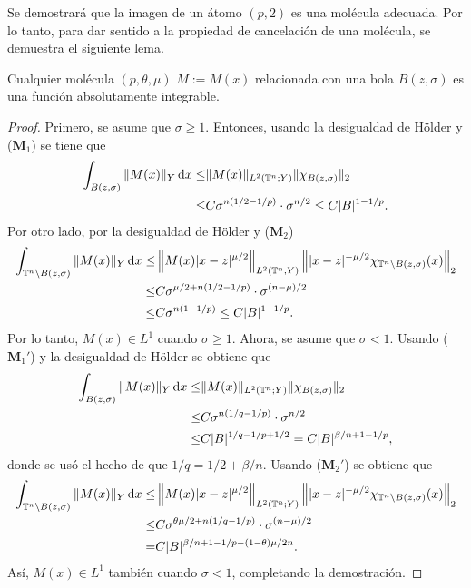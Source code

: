 Se demostrará que la imagen de un átomo $(p, 2)$ es una molécula adecuada. Por lo tanto, para dar sentido a la propiedad de cancelación de una molécula, se demuestra el siguiente lema.
\begin{lemma}
	Cualquier molécula $(p,\theta,\mu)$ $M:=M(x)$ relacionada con una bola $B(z, \sigma)$ es una función absolutamente integrable.
\end{lemma}
\begin{proof}
	Primero, se asume que $\sigma\geq1$. Entonces, usando la desigualdad de H\"older y ($\mathbf{M}_1$) se tiene que
	\begin{align*}
		\int_{B(z,\sigma)}\|M(x)\|_Y \mathop{}\!\mathrm{d} x \leq &  \|M(x)\|_{L^2(\mathbb{T}^n;Y)} \|\chi_{B(z,\sigma)}\|_2 \\
		\leq & C\sigma^{n(1/2-1/p)}\cdot \sigma^{n/2} \leq C|B|^{1-1/p}.
	\end{align*}
	Por otro lado, por la desigualdad de H\"older y ($\mathbf{M}_2$)
	\begin{align*}
		\int_{\mathbb{T}^n\setminus B(z,\sigma)}\|M(x)\|_Y\mathop{}\!\mathrm{d} x \leq &  \left\|M(x)|x-z|^{\mu/2} \right\|_{L^2(\mathbb{T}^n;Y)} \left\| |x-z|^{-\mu/2} \chi_{\mathbb{T}^n\setminus B(z,\sigma)}(x) \right\|_2 \\
		\leq & C \sigma^{\mu/2 + n(1/2-1/p)} \cdot\sigma^{(n-\mu)/2} \\
		\leq & C \sigma^{n(1-1/p)} \leq C |B|^{1-1/p}.
	\end{align*}
	Por lo tanto, $M(x) \in L^1$ cuando $\sigma \geq 1$. Ahora, se asume que $\sigma < 1$. Usando ($\mathbf{M}_1'$) y la desigualdad de H\"older se obtiene que
	\begin{align*}
		\int_{B(z,\sigma)}\|M(x)\|_Y \mathop{}\!\mathrm{d} x \leq & 
		\|M(x)\|_{L^2(\mathbb{T}^n;Y)}\|\chi_{B(z,\sigma)}\|_2 \\
		\leq & C \sigma^{n(1/q - 1/p)} \cdot \sigma^{n/2}\\ \leq & C|B|^{1/q-1/p+1/2} = C|B|^{\beta/n+1-1/p},
	\end{align*}
	donde se usó el hecho de que $1/q=1/2+\beta/n$. Usando ($\mathbf{M}_2'$) se obtiene que
	\begin{align*}
		\int_{\mathbb{T}^n\setminus B(z,\sigma)}\|M(x)\|_Y\mathop{}\!\mathrm{d} x \leq &  \left\|M(x)|x-z|^{\mu/2} \right\|_{L^2(\mathbb{T}^n;Y)} \left\| |x-z|^{-\mu/2} \chi_{\mathbb{T}^n\setminus B(z,\sigma)}(x) \right\|_2 \\
		\leq & C\sigma^{\theta\mu/2+n(1/q-1/p)} \cdot\sigma^{(n-\mu)/2} \\
		= & C|B|^{\beta/n+1-1/p-(1-\theta)\mu/2n}.
	\end{align*}
	Así, $M(x) \in L^1$ también cuando $\sigma<1$, completando la demostración.
\end{proof}
